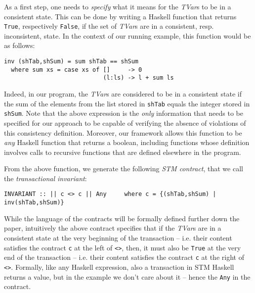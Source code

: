 \documentclass[submission,copyright,creativecommons]{eptcs}
\begin{document}
As a first step, one needs to \emph{specify} what it means for the \emph{TVar}s to be in a consistent state. This can be done by writing a Haskell function 
that returns \texttt{True}, respectively \texttt{False}, if the set of \emph{TVar}s are in a consistent, resp. inconsistent, state.  
In the context of our running example, this function 
would be as follows:

\begin{footnotesize}
\begin{verbatim}
inv (shTab,shSum) = sum shTab == shSum
  where sum xs = case xs of []     -> 0
                            (l:ls) -> l + sum ls
\end{verbatim}
\end{footnotesize}
Indeed, in our program, the \emph{TVar}s are considered to be in a consistent state if the sum of the elements from the list stored in \texttt{shTab} equals the integer stored in \texttt{shSum}.  
Note that the above expression is the \textit{only} information that needs to be specified for our approach to be capable of verifying the absence of violations of this consistency definition. Moreover, our framework allows this function to be \textit{any} Haskell function that returns a boolean, including functions whose definition involves calls to recursive functions that are defined elsewhere in the program. 


From the above function, we generate the following \emph{STM contract}, that we call the \emph{transactional invariant}:


\begin{footnotesize}
\begin{verbatim}
INVARIANT :: || c <> c || Any     where c = {(shTab,shSum) | inv(shTab,shSum)} 
\end{verbatim} 
\end{footnotesize}
While the language of the contracts will be formally defined further down the paper, intuitively the above contract specifies that if the \emph{TVar}s are in a consistent state at the very beginning of the transaction -- i.e. their content satisfies the contract \texttt{c} at the left of \texttt{<>}, then, it must also be \texttt{True} at the very end of the transaction -- i.e. their content satisfies the contract \texttt{c} at the right of \texttt{<>}. Formally, like any Haskell expression, also a transaction in STM Haskell returns a value, but in the example we don't care about it -- hence the \texttt{Any} in the contract. 
\end{document}
